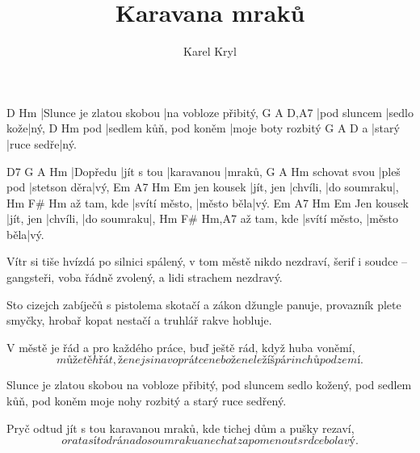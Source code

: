 \documentclass{song}
\title{Karavana mraků}
\author{Karel Kryl}
\begin{document}
\strophe
D                        Hm
|Slunce je zlatou skobou |na vobloze přibitý,
G            A          D,A7
|pod sluncem |sedlo kože|ný,
    D                      Hm
pod |sedlem kůň, pod koněm |moje boty rozbitý
  G      A          D
a |starý |ruce sedře|ný.
\endstrophe

D7      G          A          Hm
|Dopředu |jít s tou |karavanou |mraků,
             G         A            Hm
schovat svou |pleš pod |stetson děra|vý,
           Em        A7      Hm          Em
jen kousek |jít, jen |chvíli, |do soumraku|,
			Hm            F\#        Hm
až tam, kde |svítí město, |město běla|vý.
           Em        A7      Hm          Em
Jen kousek |jít, jen |chvíli, |do soumraku|,
			Hm            F\#        Hm,A7
až tam, kde |svítí město, |město běla|vý.
\endstrophe

\strophe*
Vítr si tiše hvízdá po silnici spálený,
v tom městě nikdo nezdraví,
šerif i soudce -- gangsteři, voba řádně zvolený,
a lidi strachem nezdravý.
\endstrophe

\strophe*
Sto cizejch zabíječů s pistolema skotačí
a zákon džungle panuje,
provazník plete smyčky, hrobař kopat nestačí
a truhlář rakve hobluje.
\endstrophe

V městě je řád a pro každého práce,
buď ještě rád, když huba voněmí,
\[ může tě hřát, že nejsi na voprátce
nebo že neležíš pár inchů pod zemí. \]
\endstrophe

\strophe*
Slunce je zlatou skobou na vobloze přibitý,
pod sluncem sedlo kožený,
pod sedlem kůň, pod koněm moje nohy rozbitý
a starý ruce sedřený.
\endstrophe

Pryč odtud jít s tou karavanou mraků,
kde tichej dům a pušky rezaví,
\[ orat a sít od rána do soumraku
a nechat zapomenout srdce bolavý. \]
\endstrophe
\end{document}

